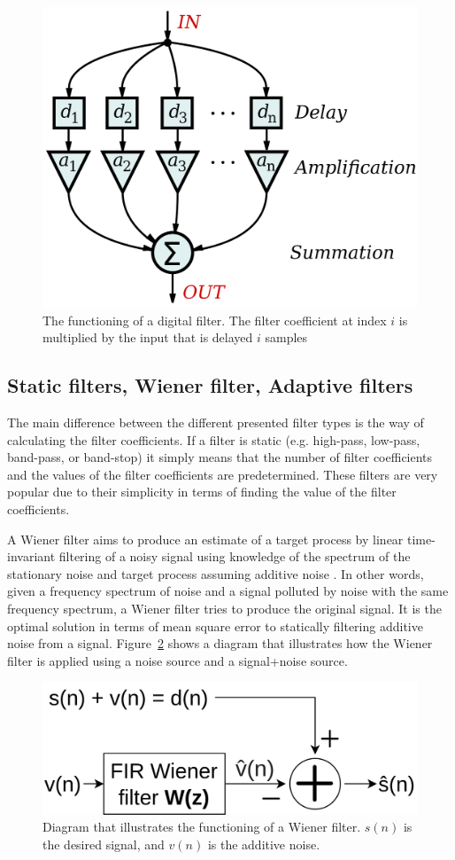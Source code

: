 \begin{figure}[h!t]
	\begin{center}
		\includegraphics[width=0.4\columnwidth]{images/wikipedia_fir_digital_filter.png}
	\end{center}
	\caption{The functioning of a digital filter. The filter coefficient at index $i$ is multiplied by the input that is delayed $i$ samples \cite{wikipedia:digital_fir_filter_image}}
	\label{fig:wiki_digital_filter_working}
\end{figure}

\subsection{Static filters, Wiener filter, Adaptive filters}\label{sec:filters_theory}
The main difference between the different presented filter types is the way of calculating the filter coefficients. If a filter is static (e.g. high-pass, low-pass, band-pass, or band-stop) it simply means that the number of filter coefficients and the values of the filter coefficients are predetermined. These filters are very popular due to their simplicity in terms of finding the value of the filter coefficients. 

A Wiener filter aims to produce an estimate of a target process by linear time-invariant filtering of a noisy signal using knowledge of the spectrum of the stationary noise and target process assuming additive noise \cite{wiki:Wiener_filter,lecture_adaptive_filters_1}. In other words, given a frequency spectrum of noise and a signal polluted by noise with the same frequency spectrum, a Wiener filter tries to produce the original signal. It is the optimal solution in terms of mean square error to statically filtering additive noise from a signal. Figure~\ref{fig:wiener_filter_diagram} shows a diagram that illustrates how the Wiener filter is applied using a noise source and a signal+noise source.

\begin{figure}[h!t]
	\begin{center}
		\includegraphics[width=0.7\columnwidth]{images/WienerFilterDiagram.png}
	\end{center}
	\caption{Diagram that illustrates the functioning of a Wiener filter. $s(n)$ is the desired signal, and $v(n)$ is the additive noise.}
	\label{fig:wiener_filter_diagram}
\end{figure}

